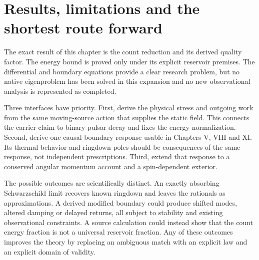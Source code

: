 \section{Results, limitations and the shortest route forward}
The exact result of this chapter is the count reduction and its derived quality factor. The energy bound is proved only under its explicit reservoir premises. The differential and boundary equations provide a clear research problem, but no native eigenproblem has been solved in this expansion and no new observational analysis is represented as completed.

Three interfaces have priority. First, derive the physical stress and outgoing work from the same moving-source action that supplies the static field. This connects the carrier claim to binary-pulsar decay and fixes the energy normalization. Second, derive one causal boundary response usable in Chapters V, VIII and XI. Its thermal behavior and ringdown poles should be consequences of the same response, not independent prescriptions. Third, extend that response to a conserved angular momentum account and a spin-dependent exterior.

The possible outcomes are scientifically distinct. An exactly absorbing Schwarzschild limit recovers known ringdown and leaves the rationals as approximations. A derived modified boundary could produce shifted modes, altered damping or delayed returns, all subject to stability and existing observational constraints. A source calculation could instead show that the count energy fraction is not a universal reservoir fraction. Any of these outcomes improves the theory by replacing an ambiguous match with an explicit law and an explicit domain of validity.

